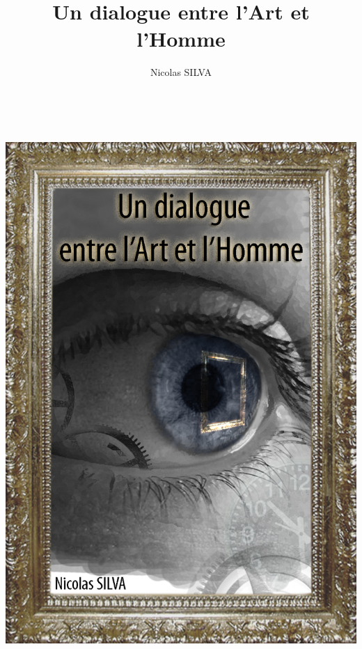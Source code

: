 \author{Nicolas SILVA}
\title{Un dialogue entre l'Art et l'Homme}

\date{} 


~\\
\begin{center}\includegraphics[width=\linewidth]{images/couverture.jpg} \end{center}
\thispagestyle{empty}
\newpage

\maketitle
\vspace{3em}
\tableofcontents
\setcounter{page}{1}
\newpage

